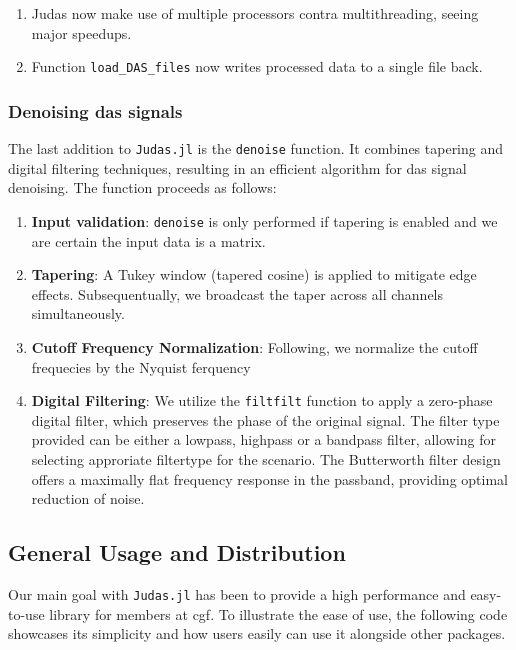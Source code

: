 \begin{enumerate}
    \item Judas now make use of multiple processors contra multithreading, seeing major speedups.
    \item Function \texttt{load\_DAS\_files} now writes processed data to a single file back.
\end{enumerate}



\subsubsection{Denoising \acrshort{das} signals}



The last addition to \texttt{Judas.jl} is the \texttt{denoise} function. It combines tapering and digital filtering techniques, resulting in an efficient algorithm for \acrshort{das} signal denoising. The function proceeds as follows:

\begin{enumerate}
    \item \textbf{Input validation}: \texttt{denoise} is only performed if tapering is enabled and we are certain the input data is a matrix.
    \item \textbf{Tapering}: A Tukey window (tapered cosine) is applied to mitigate edge effects. Subsequentually, we broadcast the taper across all channels simultaneously.
    \item \textbf{Cutoff Frequency Normalization}: Following, we   normalize the cutoff frequecies by the Nyquist ferquency
    \item \textbf{Digital Filtering}: We utilize the  \texttt{filtfilt} function to apply a zero-phase digital filter, which preserves the phase of the original signal. The filter type provided can be either a lowpass, highpass or a bandpass filter, allowing for selecting approriate filtertype for the scenario. The Butterworth filter design offers a maximally flat frequency response in the passband, providing optimal reduction of noise.
\end{enumerate}

\subsection{General Usage and Distribution}

Our main goal with \texttt{Judas.jl} has been to provide a high performance and easy-to-use library for members at \acrshort{cgf}. To illustrate the ease of use, the following code showcases its simplicity and how users easily can use it alongside other packages. \\

